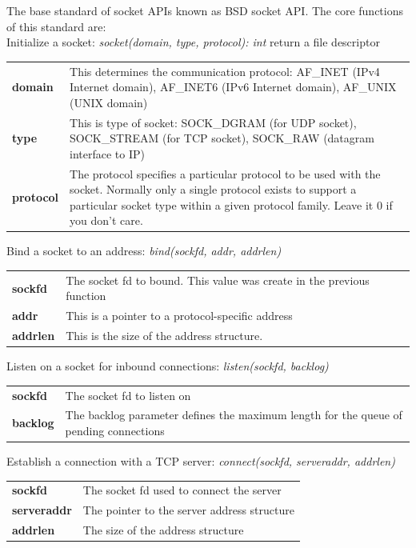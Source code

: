 \documentclass[a4paper, 11pt]{article}
\begin{document}
The base standard of socket APIs known as BSD socket API. The core functions of this standard are:\\

\noindent Initialize a socket: \textit{socket(domain, type, protocol): int} return a file descriptor\\
 	\begin{tabular}{ p{2cm} p{10cm} }
 		\textbf{domain} & This determines the communication protocol: AF\_INET (IPv4 Internet domain), AF\_INET6 (IPv6 Internet domain), AF\_UNIX (UNIX domain)\\
 		\textbf{type} & This is type of socket: SOCK\_DGRAM (for UDP socket), SOCK\_STREAM (for TCP socket), SOCK\_RAW (datagram interface to IP)\\
 		\textbf{protocol} & The protocol specifies a particular protocol to be used with the socket. Normally only a single protocol exists to support a particular socket type within a given protocol family. Leave it 0 if you don't care.
 	\end{tabular}
 	
\noindent Bind a socket to an address: \textit{bind(sockfd, addr, addrlen)}\\
	\begin{tabular}{ p{2cm} p{10cm} }
 		\textbf{sockfd} & The socket fd to bound. This value was create in the previous function\\
 		\textbf{addr} & This is a pointer to a protocol-specific address\\
 		\textbf{addrlen} & This is the size of the address structure.
 	\end{tabular}
 	
\noindent Listen on a socket for inbound connections: \textit{listen(sockfd, backlog)}\\
	\begin{tabular}{ p{2cm} p{10cm} }
		\textbf{sockfd} & The socket fd to listen on\\
		\textbf{backlog} & The backlog parameter defines the maximum length for the queue of pending connections
	\end{tabular}
	
\noindent Establish a connection with a TCP server: \textit{connect(sockfd, serveraddr, addrlen)}\\
	\begin{tabular}{ p{2cm} p{10cm} }
		\textbf{sockfd} & The socket fd used to connect the server\\
		\textbf{serveraddr} & The pointer to the server address structure\\
		\textbf{addrlen} & The size of the address structure
	\end{tabular}
\end{document}
